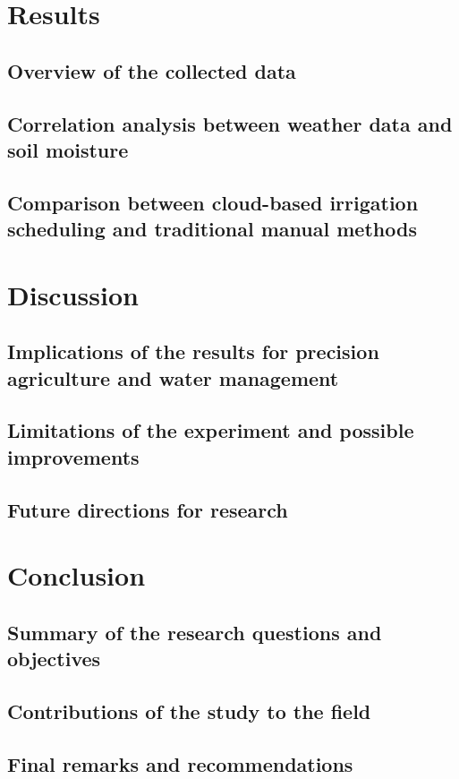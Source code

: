 \documentclass[11pt]{scrartcl} %
\begin{document}
\section{Results}
\subsection{Overview of the collected data}
\subsection{Correlation analysis between weather data and soil moisture}
\subsection{Comparison between cloud-based irrigation scheduling and traditional manual methods}
\section{Discussion}
\subsection{Implications of the results for precision agriculture and water management}
\subsection{Limitations of the experiment and possible improvements}
\subsection{Future directions for research}
\section{Conclusion}
\subsection{Summary of the research questions and objectives}
\subsection{Contributions of the study to the field}
\subsection{Final remarks and recommendations}


\newpage
\printbibliography[title=References]
\end{document}
